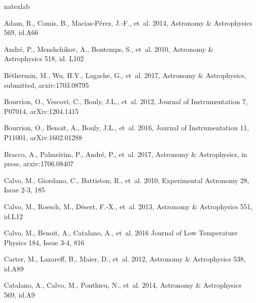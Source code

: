 \begin{thebibliography}{99}

\expandafter\ifx\csname natexlab\endcsname\relax\def\natexlab#1{#1}\fi

Adam, R., Comis, B., Mac\'ias-P\'erez, J.-F., {et~al.} 2014, 
Astronomy \& Astrophysics 569, id.A66


Andr\'e, P., Menshchikov, A., Bontemps, S., {et~al.} 2010, 
Astronomy \& Astrophysics 518, id. L102

B\'ethermin, M., Wu, H.Y., Lagache, G., {et~al.} 2017, 
Astronomy \& Astrophysics, submitted, arxiv:1703.08795

Bourrion, O., Vescovi, C., Bouly, J.L., {et~al.} 2012, 
Journal of Instrumentation 7, P07014, arXiv:1204.1415

Bourrion, O., Benoit, A., Bouly, J.L., {et~al.} 2016, 
Journal of Instrumentation 11, P11001, arXiv:1602.01288

Bracco, A., Palmeirim, P., Andr\'e, P., {et~al.} 2017, 
Astronomy \& Astrophysics, in press, arxiv:1706.08407

Calvo, M., Giordano, C., Battiston, R., {et~al.} 2010, 
Experimental Astronomy 28, Issue 2-3, 185

Calvo, M., Roesch, M., D\'esert, F.-X., {et~al.} 2013, 
Astronomy \& Astrophysics 551, id.L12

Calvo, M., Benoit, A., Catalano, A., {et~al.} 2016
Journal of Low Temperature Physics 184, Issue 3-4, 816

Carter, M., Lazareff, B., Maier, D., {et~al.} 2012, 
Astronomy \& Astrophysics 538, id.A89

Catalano, A., Calvo, M., Ponthieu, N., {et~al.} 2014, 
Astronomy \& Astrophysics 569, id.A9


\end{thebibliography}
